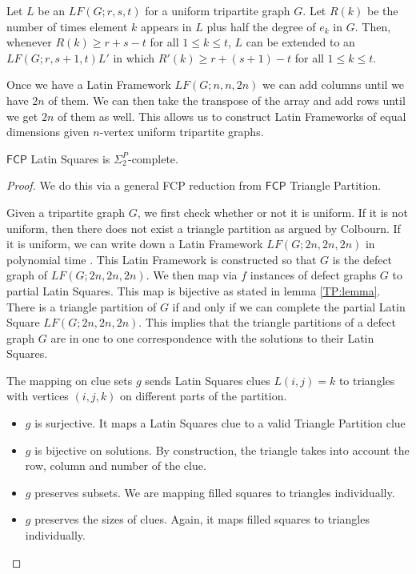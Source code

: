 \documentclass[runningheads,a4paper]{llncs}
\begin{document}
\begin{lemma}
Let $L$ be an $LF(G;r,s,t)$ for a uniform tripartite graph $G$. Let $R(k)$ be the number of times element $k$ appears in $L$ plus half the degree of $e_k$ in $G$. Then, whenever $R(k) \geq r + s - t$ for all $1 \leq k \leq t$, $L$ can be extended to an $LF(G;r, s+1, t) L'$ in which $R'(k) \geq r + (s+1) - t$ for all $1 \leq k \leq t$. 
\end{lemma} 

Once we have a Latin Framework $LF(G;n, n, 2n)$ we can add columns until we have $2n$ of them. We can then take the transpose of the array and add rows until we get $2n$ of them as well. This allows us to construct Latin Frameworks of equal dimensions given $n$-vertex uniform tripartite graphs. 

\begin{theorem}
$\mathsf{FCP}$ Latin Squares is $\Sigma_2^P$-complete.
\end{theorem}

\begin{proof}
We do this via a general FCP reduction from $\mathsf{FCP}$ Triangle Partition.

Given a tripartite graph $G$, we first check whether or not it is uniform. If it is not uniform, then there does not exist a triangle partition as argued by Colbourn. If it is uniform, we can write down a Latin Framework $LF(G;2n,2n,2n)$ in polynomial time \cite{colbourn1984complexity}. This Latin Framework is constructed so that $G$ is the defect graph of $LF(G;2n,2n,2n)$. We then map via $f$ instances of defect graphs $G$ to partial Latin Squares. This map is bijective as stated in lemma \ref{TP:lemma}. There is a triangle partition of $G$ if and only if we can complete the partial Latin Square $LF(G;2n,2n,2n)$. This implies that the triangle partitions of a defect graph $G$ are in one to one correspondence with the solutions to their Latin Squares. 

The mapping on clue sets $g$ sends Latin Squares clues $L(i,j) = k$ to triangles with vertices $(i,j,k)$ on different parts of the partition. 
\begin{itemize}
	\item $g$ is surjective. It maps a Latin Squares clue to a valid Triangle Partition clue
	\item $g$ is bijective on solutions. By construction, the triangle takes into account the row, column and number of the clue.
	\item $g$ preserves subsets. We are mapping filled squares to triangles individually.
	\item $g$ preserves the sizes of clues. Again, it maps filled squares to triangles individually. 
\end{itemize}

\end{proof}
\end{document}

